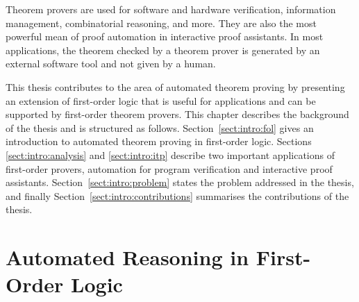{Theorem provers are used for software and hardware verification, information management, combinatorial reasoning, and more. They are also the most powerful mean of proof automation in interactive proof assistants. In most applications, the theorem checked by a theorem prover is generated by an external software tool and not given by a human. %

This thesis contributes to the area of automated theorem proving by presenting an extension of first-order logic that is useful for applications and can be supported by first-order theorem provers. This chapter describes the background of the thesis and is structured as follows. Section~\ref{sect:intro:fol} gives an introduction to automated theorem proving in first-order logic. Sections \ref{sect:intro:analysis} and \ref{sect:intro:itp} describe two important applications of first-order provers, automation for program verification and interactive proof assistants. Section~\ref{sect:intro:problem} states the problem addressed in the thesis, and finally Section~\ref{sect:intro:contributions} summarises the contributions of the thesis.
}

\section*{Automated Reasoning in First-Order Logic}

